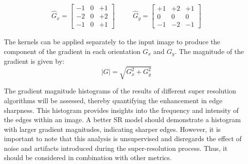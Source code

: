         \begin{equation}
            \begin{array}{ccc}
            \hat{G}_x = \begin{bmatrix}
            -1 & 0 & +1 \\
            -2 & 0 & +2 \\
            -1 & 0 & +1
            \end{bmatrix}
            &
            \quad
            &
            \hat{G}_y = \begin{bmatrix}
            +1 & +2 & +1 \\
             0 &  0 &  0 \\
            -1 & -2 & -1
            \end{bmatrix}
            \end{array}
            \label{eq:4-sobel-operators}
        \end{equation}
    
         The kernels can be applied separately to the input image to produce the component of the gradient in each orientation $G_x$ and $G_y$. The magnitude of the gradient  is given by: 
         \begin{equation}
             |G| = \sqrt{G_x^2 + G_y^2}
             \label{eq:4-gradient_magnitude}
         \end{equation}

         The gradient magnitude histograms of the results of different super resolution algorithms will be assessed, thereby quantifying the enhancement in edge sharpness.
         This histogram provides insights into the frequency and intensity of the edges within an image.
         A better SR model should demonstrate a histogram with larger gradient magnitudes, indicating sharper edges.
         However, it is important to note that this analysis is unsupervised and disregards the effect of noise and artifacts introduced during the super-resolution process. Thus, it should be considered in combination with other metrics.

